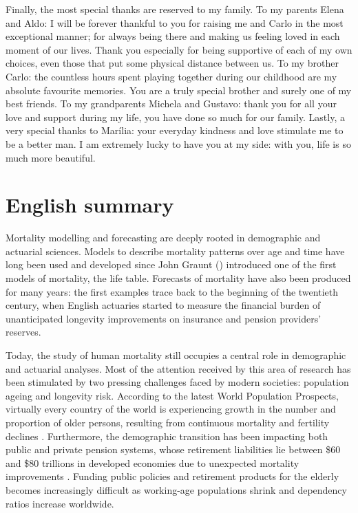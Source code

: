 \documentclass[Thesis]{subfiles}
\begin{document}
Finally, the most special thanks are reserved to my family. To my parents Elena and Aldo: I will be forever thankful to you for raising me and Carlo in the most exceptional manner; for always being there and making us feeling loved in each moment of our lives. Thank you especially for being supportive of each of my own choices, even those that put some physical distance between us. To my brother Carlo: the countless hours spent playing together during our childhood are my absolute favourite memories. You are a truly special brother and surely one of my best friends. To my grandparents Michela and Gustavo: thank you for all your love and support during my life, you have done so much for our family. Lastly, a very special thanks to Mar\'{i}lia: your everyday kindness and love stimulate me to be a better man. I am extremely lucky to have you at my side: with you, life is so much more beautiful. 

\newpage

\chapter*{English summary}
\vspace{-0.5cm}

Mortality modelling and forecasting are deeply rooted in demographic and actuarial sciences. Models to describe mortality patterns over age and time have long been used and developed since John Graunt (\citeyear{graunt1662natural}) introduced one of the first models of mortality, the life table. Forecasts of mortality have also been produced for many years: the first examples trace back to the beginning of the twentieth century, when English actuaries started to measure the financial burden of unanticipated longevity improvements on insurance and pension providers' reserves.  

Today, the study of human mortality still occupies a central role in demographic and actuarial analyses. Most of the attention received by this area of research has been stimulated by two pressing challenges faced by modern societies: population ageing and longevity risk. According to the latest World Population Prospects, virtually every country of the world is experiencing growth in the number and proportion of older persons, resulting from continuous mortality and fertility declines \citep{United2019wpp}. Furthermore, the demographic transition has been impacting both public and private pension systems, whose retirement liabilities lie between \$60 and \$80 trillions in developed economies due to unexpected mortality improvements \citep{michaelson2014strategy}. Funding public policies and retirement products for the elderly becomes increasingly difficult as working-age populations shrink and dependency ratios increase worldwide.   
\end{document}
